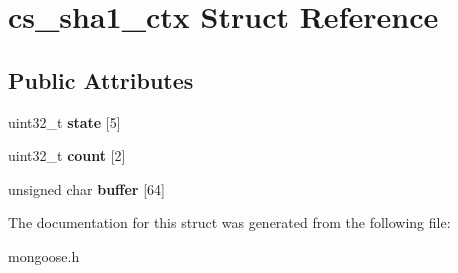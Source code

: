 \hypertarget{structcs__sha1__ctx}{}\section{cs\+\_\+sha1\+\_\+ctx Struct Reference}
\label{structcs__sha1__ctx}
\subsection*{Public Attributes}
\begin{DoxyCompactItemize}
\item 
\mbox{\label{structcs__sha1__ctx_aaec67b16b157c16a771df82ec41220b0}} 
uint32\+\_\+t {\bfseries state} \mbox{[}5\mbox{]}
\item 
\mbox{\label{structcs__sha1__ctx_af6258c6cb812c334f1a287e2d6b9ea09}} 
uint32\+\_\+t {\bfseries count} \mbox{[}2\mbox{]}
\item 
\mbox{\label{structcs__sha1__ctx_ac7c9295501f0e13de5b0db4305a2719b}} 
unsigned char {\bfseries buffer} \mbox{[}64\mbox{]}
\end{DoxyCompactItemize}


The documentation for this struct was generated from the following file\+:\begin{DoxyCompactItemize}
\item 
mongoose.\+h\end{DoxyCompactItemize}
